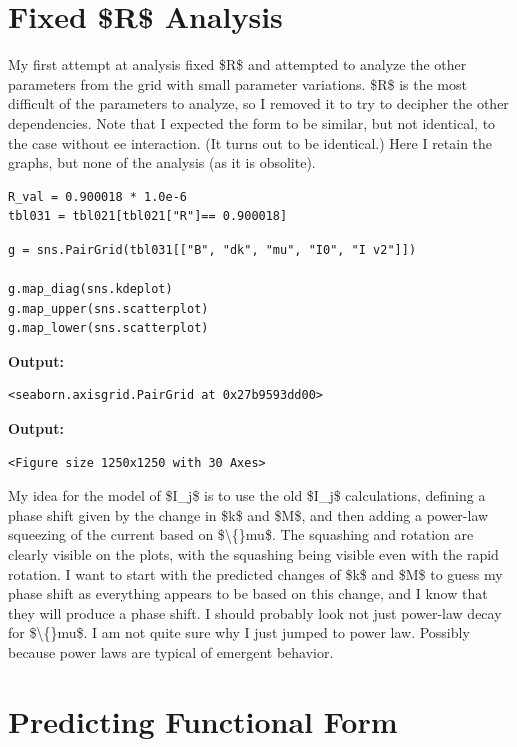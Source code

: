 \documentclass{article}
\begin{document}
\section{Fixed \$R\$ Analysis}

My first attempt at analysis fixed \$R\$ and attempted to analyze the other parameters from the grid with small parameter variations. \$R\$ is the most difficult of the parameters to analyze, so I removed it to try to decipher the other dependencies. Note that I expected the form to be similar, but not identical, to the case without ee interaction. (It turns out to be identical.) Here I retain the graphs, but none of the analysis (as it is obsolite). 

\begin{lstlisting}
R_val = 0.900018 * 1.0e-6
tbl031 = tbl021[tbl021["R"]== 0.900018]\end{lstlisting}

\begin{lstlisting}
g = sns.PairGrid(tbl031[["B", "dk", "mu", "I0", "I v2"]])

g.map_diag(sns.kdeplot)
g.map_upper(sns.scatterplot)
g.map_lower(sns.scatterplot)\end{lstlisting}

\textbf{Output:}\begin{verbatim}
<seaborn.axisgrid.PairGrid at 0x27b9593dd00>
\end{verbatim}

\textbf{Output:}\begin{verbatim}
<Figure size 1250x1250 with 30 Axes>
\end{verbatim}

My idea for the model of \$I\_j\$  is to use the old \$I\_j\$ calculations, defining a phase shift given by the change in \$k\$ and \$M\$, and then adding a power-law squeezing of the current based on \$\textbackslash\{\}mu\$. The squashing and rotation are clearly visible on the plots, with the squashing being visible even with the rapid rotation. I want to start with the predicted changes of \$k\$ and \$M\$ to guess my phase shift as everything appears to be based on this change, and I know that they will produce a phase shift. I should probably look not just power-law decay for \$\textbackslash\{\}mu\$. I am not quite sure why I just jumped to power law. Possibly because power laws are typical of emergent behavior.

\section{Predicting Functional Form}
\end{document}

